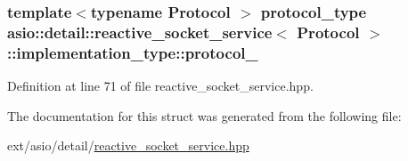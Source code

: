 \subsubsection[{protocol\+\_\+}]{\setlength{\rightskip}{0pt plus 5cm}template$<$typename Protocol $>$ {\bf protocol\+\_\+type} {\bf asio\+::detail\+::reactive\+\_\+socket\+\_\+service}$<$ Protocol $>$\+::implementation\+\_\+type\+::protocol\+\_\+}\label{structasio_1_1detail_1_1reactive__socket__service_1_1implementation__type_a2758dd8a5ce0dee6fb61e2df2d50253d}


Definition at line 71 of file reactive\+\_\+socket\+\_\+service.\+hpp.



The documentation for this struct was generated from the following file\+:\begin{DoxyCompactItemize}
\item 
ext/asio/detail/\hyperlink{reactive__socket__service_8hpp}{reactive\+\_\+socket\+\_\+service.\+hpp}\end{DoxyCompactItemize}
